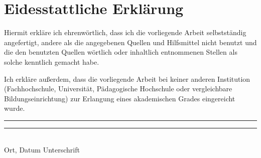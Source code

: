 {}
\chapter*{Eidesstattliche Erklärung}

Hiermit erkläre ich ehrenwörtlich, dass ich die vorliegende Arbeit selbstständig angefertigt, andere als die angegebenen Quellen und Hilfsmittel nicht benutzt und die den benutzten Quellen wörtlich oder inhaltlich entnommenen Stellen als solche kenntlich gemacht habe.

\noindent

Ich erkläre außerdem, dass die vorliegende Arbeit bei keiner anderen Institution (Fachhochschule, Universität, Pädagogische Hochschule oder vergleichbare Bildungseinrichtung) zur Erlangung eines akademischen Grades eingereicht wurde.
\vspace{3cm}

\noindent

\rule[1em]{15em}{0.5pt}  \hfill \rule[1em]{15em}{0.5pt}\\ %
Ort, Datum \hfill Unterschrift\\

